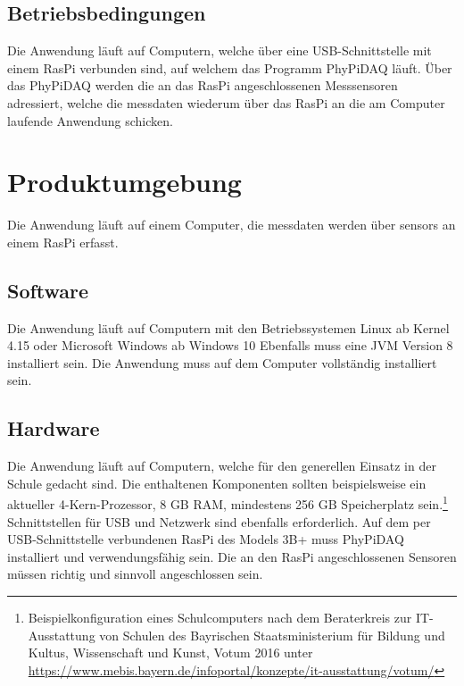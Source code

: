 \documentclass[parskip=full]{scrartcl}
\begin{document}
\subsection{Betriebsbedingungen}

Die Anwendung läuft auf Computern, welche über eine USB-Schnittstelle mit einem \gls{RasPi} verbunden sind, auf welchem das Programm \gls{PhyPiDAQ} läuft. Über das \gls{PhyPiDAQ} werden die an das \gls{RasPi} angeschlossenen Messsensoren adressiert, welche die \gls{messdaten} wiederum über das \gls{RasPi} an die am Computer laufende Anwendung schicken. 


\clearpage
\section{Produktumgebung}\label{produktumgebung}

Die Anwendung läuft auf einem Computer, die \gls{messdaten} werden über \glspl{sensor} an einem \gls{RasPi} erfasst.

\subsection{Software}

Die Anwendung läuft auf Computern mit den Betriebssystemen Linux ab Kernel 4.15 oder Microsoft Windows ab Windows 10
Ebenfalls muss eine \gls{JVM} Version 8 installiert sein. Die Anwendung muss auf dem Computer vollständig installiert sein. 

\subsection{Hardware}

Die Anwendung läuft auf Computern, welche für den generellen Einsatz in der Schule gedacht sind.
Die enthaltenen Komponenten sollten beispielsweise ein aktueller 4-Kern-Prozessor, 8 GB RAM,
mindestens 256 GB Speicherplatz sein.\footnote{Beispielkonfiguration eines Schulcomputers nach dem Beraterkreis zur IT-Ausstattung von Schulen des Bayrischen Staatsministerium für Bildung und Kultus, Wissenschaft und Kunst, Votum 2016 unter \url{https://www.mebis.bayern.de/infoportal/konzepte/it-ausstattung/votum/}} Schnittstellen für USB und Netzwerk sind ebenfalls erforderlich. 
Auf dem per USB-Schnittstelle verbundenen \gls{RasPi} des Models 3B+ muss \gls{PhyPiDAQ} installiert und verwendungsfähig sein.
Die an den \gls{RasPi} angeschlossenen Sensoren müssen richtig und sinnvoll angeschlossen sein.
\end{document}
